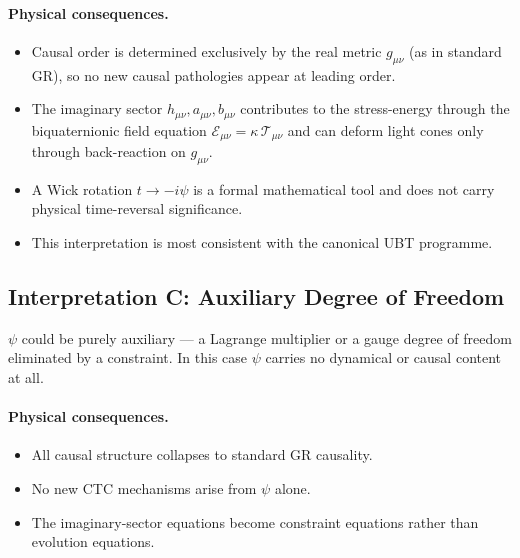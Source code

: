 \documentclass[12pt]{article}
\begin{document}
\paragraph{Physical consequences.}
\begin{itemize}
  \item Causal order is determined exclusively by the real metric $g_{\mu\nu}$
    (as in standard GR), so no new causal pathologies appear at leading order.
  \item The imaginary sector $h_{\mu\nu},a_{\mu\nu},b_{\mu\nu}$ contributes
    to the stress-energy through the biquaternionic field equation
    $\mathcal{E}_{\mu\nu} = \kappa\,\mathcal{T}_{\mu\nu}$ and can
    deform light cones only through back-reaction on $g_{\mu\nu}$.
  \item A Wick rotation $t \to -i\psi$ is a formal mathematical tool and
    does not carry physical time-reversal significance.
  \item This interpretation is most consistent with the canonical UBT
    programme.
\end{itemize}

\subsection{Interpretation C: Auxiliary Degree of Freedom}

$\psi$ could be purely auxiliary — a Lagrange multiplier or a gauge
degree of freedom eliminated by a constraint.  In this case $\psi$ carries
no dynamical or causal content at all.

\paragraph{Physical consequences.}
\begin{itemize}
  \item All causal structure collapses to standard GR causality.
  \item No new CTC mechanisms arise from $\psi$ alone.
  \item The imaginary-sector equations become constraint equations rather
    than evolution equations.
\end{itemize}

\end{document}
